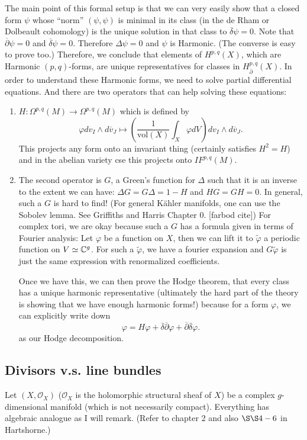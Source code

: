 The main point of this formal setup is that we can very easily show that a closed form $\psi$ whose ``norm'' $(\psi,\psi)$ is minimal in its class (in the de Rham or Dolbeault cohomology) is the unique solution in that class to $\overline{\delta}\psi=0$. Note that $\overline{\partial}\psi=0$ and $\overline{\delta}\psi=0$. Therefore $\Delta \psi=0$ and $\psi$ is Harmonic. (The converse is easy to prove too.) Therefore, we conclude that elements of $H^{p,q}(X)$, which are Harmonic $(p,q)$-forms, are unique representatives for classes in $H^{p,q}_{\overline{\partial}}(X)$. In order to understand these Harmonic forms, we need to solve partial differential equations. And there are two operators that can help solving these equations:
\begin{enumerate}
\item $H:\Omega^{p,q}(M)\to \Omega^{p,q}(M)$ which is defined by
$$\varphi dv_I\wedge d\overline{v}_J\mapsto \left(\frac{1}{\text{vol}(X)}\int_X \varphi dV\right)dv_I\wedge d\overline{v}_J.$$
This projects any form onto an invariant thing (certainly satisfies $H^2=H$) and in the abelian variety cse this projects onto $IF^{p,q}(M)$. 

\item The second operator is $G$, a Green's function for $\Delta$ such that it is an inverse to the extent we can have: $\Delta G=G\Delta = 1-H$ and $HG=GH=0$. In general, such a $G$ is hard to find! (For general K\"{a}hler manifolds, one can use the Sobolev lemma. See Griffiths and Harris Chapter $0$. [farbod cite]) For complex tori, we are okay because such a $G$ has a formula given in terms of Fourier analysis: Let $\varphi$ be a function on $X$, then we can lift it to $\tilde{\varphi}$ a periodic function on $V\simeq {\mathbb C}^g$. For such a $\tilde{\varphi}$, we have a fourier expansion and $G\tilde{\varphi}$ is just the same expression with renormalized coefficients. 

Once we have this, we can then prove the Hodge theorem, that every class has a unique harmonic representative (ultimately the hard part of the theory is showing that we have enough harmonic forms!) because for a form $\varphi$, we can explicitly write down
$$\varphi=H\varphi + \overline{\delta}\overline{\partial}\varphi+\overline{\partial}\overline{\delta}\varphi.$$ as our Hodge decomposition.
\end{enumerate}

\subsection{Divisors v.s. line bundles}
Let $(X,\mathcal{O}_X)$ ($\mathcal{O}_X$ is the holomorphic structural sheaf of $X$) be a complex $g$-dimensional manifold (which is not necessarily compact). Everything has algebraic analogue as I will remark. (Refer to chapter 2 and also $\S\S 4-6$ in Hartshorne.) 

